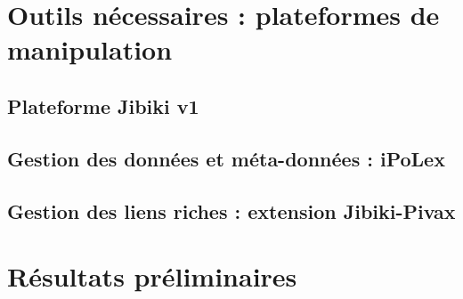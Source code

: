 \documentclass[10pt,a4paper,twoside]{article}
\begin{document}
\section{Outils nécessaires : plateformes de manipulation}

\subsection{Plateforme Jibiki v1}

\cite{MMCE11}

\cite{MMAC06}

\subsection{Gestion des données et méta-données : iPoLex}


\subsection{Gestion des liens riches : extension Jibiki-Pivax}


\section{Résultats préliminaires}


\end{document}
